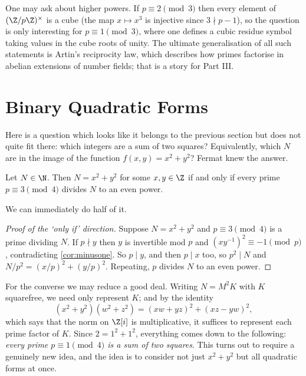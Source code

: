 \begin{remark}
	One may ask about higher powers. If $p \equiv 2 \pmod 3$ then every element of $(\Z/p\Z)^\times$ is a cube (the map $x \mapsto x^3$ is injective since $3 \nmid p-1$), so the question is only interesting for $p \equiv 1 \pmod 3$, where one defines a cubic residue symbol taking values in the cube roots of unity. The ultimate generalisation of all such statements is Artin's reciprocity law, which describes how primes factorise in abelian extensions of number fields; that is a story for Part III.
\end{remark}

\section{Binary Quadratic Forms}

Here is a question which looks like it belongs to the previous section but does not quite fit there: which integers are a sum of two squares? Equivalently, which $N$ are in the image of the function $f(x,y) = x^2 + y^2$? Fermat knew the answer.

\begin{theorem}\label{nt-thm:twosquares}
	Let $N \in \N$. Then $N = x^2 + y^2$ for some $x, y \in \Z$ if and only if every prime $p \equiv 3 \pmod 4$ divides $N$ to an even power.
\end{theorem}

We can immediately do half of it.

\begin{proof}[Proof of the `only if' direction]
	Suppose $N = x^2 + y^2$ and $p \equiv 3 \pmod 4$ is a prime dividing $N$. If $p \nmid y$ then $y$ is invertible mod $p$ and $(xy^{-1})^2 \equiv -1 \pmod p$, contradicting \autoref{cor:minusone}. So $p \mid y$, and then $p \mid x$ too, so $p^2 \mid N$ and $N/p^2 = (x/p)^2 + (y/p)^2$. Repeating, $p$ divides $N$ to an even power.
\end{proof}

For the converse we may reduce a good deal. Writing $N = M^2 K$ with $K$ squarefree, we need only represent $K$; and by the identity
$$
(x^2 + y^2)(w^2 + z^2) = (xw + yz)^2 + (xz - yw)^2,
$$
which says that the norm on $\Z[i]$ is multiplicative, it suffices to represent each prime factor of $K$. Since $2 = 1^2 + 1^2$, everything comes down to the following: \emph{every prime $p \equiv 1 \pmod 4$ is a sum of two squares}. This turns out to require a genuinely new idea, and the idea is to consider not just $x^2 + y^2$ but all quadratic forms at once.

